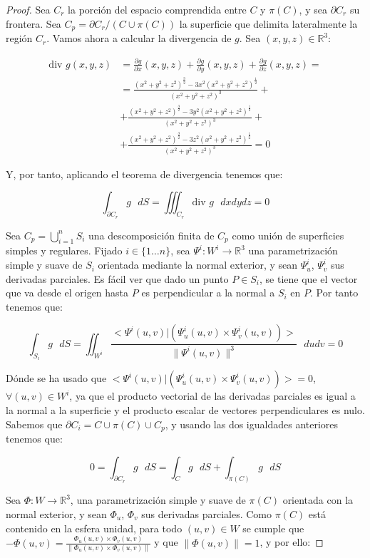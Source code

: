 \begin{proof}

Sea $C_r$ la porción del espacio comprendida entre $C$ y $\pi (C)$, y sea $\partial C_r$ su frontera. Sea $C_p = \partial C_r /(C\cup \pi(C))$ la superficie que delimita lateralmente la región $C_r$. Vamos ahora a calcular la divergencia de $g$. Sea $(x,y,z)\in \mathds{R}^3$:

\begin{align*}
  \textrm{div } g (x,y,z) &= \frac{\partial g}{\partial x}(x,y,z) + \frac{\partial g}{\partial y}(x,y,z) + \frac{\partial g}{\partial z} (x,y,z) =\\
  & = \frac{(x^2+y^2+z^2)^{\frac{3}{2}}-3x^2(x^2+y^2+z^2)^{\frac{1}{2}}}{(x^2+y^2+z^2)^3} +\\
  & + \frac{(x^2+y^2+z^2)^{\frac{3}{2}}-3y^2(x^2+y^2+z^2)^{\frac{1}{2}}}{(x^2+y^2+z^2)^3} +\\
  &+ \frac{(x^2+y^2+z^2)^{\frac{3}{2}}-3z^2(x^2+y^2+z^2)^{\frac{1}{2}}}{(x^2+y^2+z^2)^3} = 0
\end{align*}

Y, por tanto, aplicando el teorema de divergencia tenemos que:

$$\int _{\partial C_r}g\text{ } dS = \iiint _{C_r}\text{div } g \text{ }dx dy dz = 0$$

Sea $C_p = \bigcup _{i=1}^n S_i$ una descomposición finita de $C_p$ como unión de superficies simples y regulares. Fijado $i\in \{1\ldots n\}$, sea $\Psi^i : W^i \rightarrow \mathds{R}^3$ una parametrización simple y suave de $S_i$ orientada mediante la normal exterior, y sean $\Psi^i_u$, $\Psi^i_v$ sus derivadas parciales. Es fácil ver que dado un punto $P\in S_i$, se tiene que el vector que va desde el origen hasta $P$ es perpendicular a la normal a $S_i$ en $P$. Por tanto tenemos que:

$$ \int_{S_i} g\text{ }dS = \iint _{W^i} \frac{<\Psi^i(u,v) | (\Psi^i_u(u,v)\times \Psi^i_v (u,v))>}{\|\Psi^i(u,v)\|^3}\text{ } du dv = 0$$


Dónde se ha usado que $<\Psi^i(u,v) | (\Psi^i_u(u,v)\times \Psi^i_v (u,v))> = 0$, $\forall (u,v)\in W^i$, ya que el producto vectorial de las derivadas parciales es igual a la normal a la superficie y el producto escalar de vectores perpendiculares es nulo. Sabemos que $\partial C_i = C\cup \pi(C) \cup C_p$, y usando las dos igualdades anteriores tenemos que:

$$0 = \int _{\partial C_r}g\text{ } dS = \int _{C}g\text{ } dS + \int _{\pi(C)}g\text{ } dS $$

Sea $\Phi :W\rightarrow \mathds{R}^3$, una parametrización simple y suave de $\pi (C)$ orientada con la normal exterior, y sean $\Phi _u$, $\Phi _v$ sus derivadas parciales. Como $\pi (C)$ está contenido en la esfera unidad, para todo $(u,v)\in W$ se cumple que $-\Phi(u,v) = \frac{\Phi_u(u,v)\times \Phi_v (u,v)}{\|\Phi_u(u,v)\times \Phi_v (u,v)\|}$ y que  $\|\Phi(u,v)\| = 1$, y por ello:


\end{proof}
